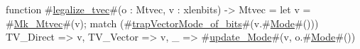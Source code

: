 function #\hyperref[sailRISCVzlegalizzezytvec]{legalize\_tvec}#(o : Mtvec, v : xlenbits) -> Mtvec = {
 let v = #\hyperref[sailRISCVzMkzyMtvec]{Mk\_Mtvec}#(v);
 match (#\hyperref[sailRISCVztrapVectorModezyofzybits]{trapVectorMode\_of\_bits}#(v.#\hyperref[sailRISCVzMode]{Mode}#())) {
   TV_Direct => v,
   TV_Vector => v,
   _         => #\hyperref[sailRISCVzupdatezyMode]{update\_Mode}#(v, o.#\hyperref[sailRISCVzMode]{Mode}#())
 }
}

